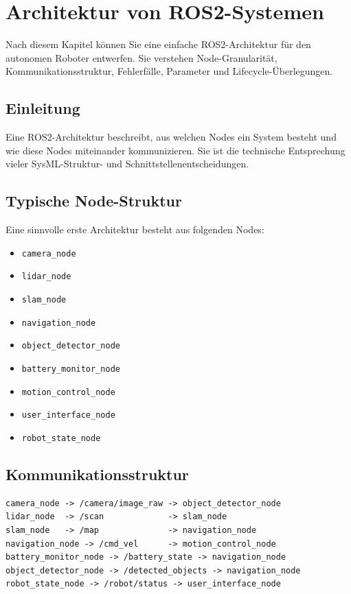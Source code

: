 \chapter{Architektur von ROS2-Systemen}

\begin{lernziele}
Nach diesem Kapitel können Sie eine einfache ROS2-Architektur für den autonomen Roboter entwerfen. Sie verstehen Node-Granularität, Kommunikationsstruktur, Fehlerfälle, Parameter und Lifecycle-Überlegungen.
\end{lernziele}

\section{Einleitung}
Eine ROS2-Architektur beschreibt, aus welchen Nodes ein System besteht und wie diese Nodes miteinander kommunizieren. Sie ist die technische Entsprechung vieler SysML-Struktur- und Schnittstellenentscheidungen.

\section{Typische Node-Struktur}
Eine sinnvolle erste Architektur besteht aus folgenden Nodes:

\begin{itemize}
    \item \texttt{camera\_node}
    \item \texttt{lidar\_node}
    \item \texttt{slam\_node}
    \item \texttt{navigation\_node}
    \item \texttt{object\_detector\_node}
    \item \texttt{battery\_monitor\_node}
    \item \texttt{motion\_control\_node}
    \item \texttt{user\_interface\_node}
    \item \texttt{robot\_state\_node}
\end{itemize}

\section{Kommunikationsstruktur}
\begin{lstlisting}[style=plaintext]
camera_node -> /camera/image_raw -> object_detector_node
lidar_node  -> /scan             -> slam_node
slam_node   -> /map              -> navigation_node
navigation_node -> /cmd_vel      -> motion_control_node
battery_monitor_node -> /battery_state -> navigation_node
object_detector_node -> /detected_objects -> navigation_node
robot_state_node -> /robot/status -> user_interface_node
\end{lstlisting}

